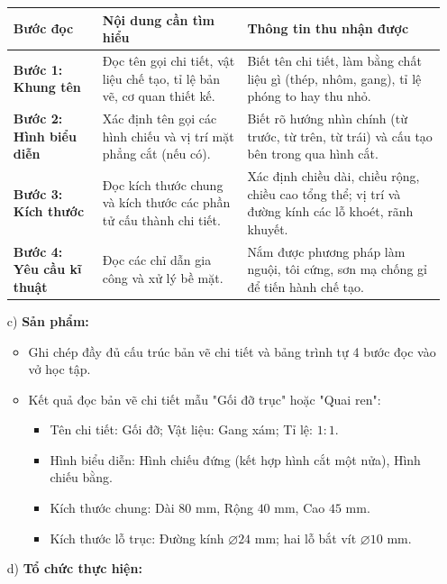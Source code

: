 \documentclass[12pt, a4paper]{article}
\begin{document}
\begin{itemize}[leftmargin=1.2cm]
    \begin{center}
    \begin{tabularx}{\textwidth}{|>{\bfseries}p{3.2cm}|X|X|}
    \hline
    \textbf{Bước đọc} & \textbf{Nội dung cần tìm hiểu} & \textbf{Thông tin thu nhận được} \\ \hline
    Bước 1: Khung tên & Đọc tên gọi chi tiết, vật liệu chế tạo, tỉ lệ bản vẽ, cơ quan thiết kế. & Biết tên chi tiết, làm bằng chất liệu gì (thép, nhôm, gang), tỉ lệ phóng to hay thu nhỏ. \\ \hline
    Bước 2: Hình biểu diễn & Xác định tên gọi các hình chiếu và vị trí mặt phẳng cắt (nếu có). & Biết rõ hướng nhìn chính (từ trước, từ trên, từ trái) và cấu tạo bên trong qua hình cắt. \\ \hline
    Bước 3: Kích thước & Đọc kích thước chung và kích thước các phần tử cấu thành chi tiết. & Xác định chiều dài, chiều rộng, chiều cao tổng thể; vị trí và đường kính các lỗ khoét, rãnh khuyết. \\ \hline
    Bước 4: Yêu cầu kĩ thuật & Đọc các chỉ dẫn gia công và xử lý bề mặt. & Nắm được phương pháp làm nguội, tôi cứng, sơn mạ chống gỉ để tiến hành chế tạo. \\ \hline
    \end{tabularx}
    \end{center}

    \item[c)] \textbf{Sản phẩm:}
    \begin{itemize}[leftmargin=0.6cm]
        \item Ghi chép đầy đủ cấu trúc bản vẽ chi tiết và bảng trình tự 4 bước đọc vào vở học tập.
        \item Kết quả đọc bản vẽ chi tiết mẫu "Gối đỡ trục" hoặc "Quai ren":
        \begin{itemize}
            \item Tên chi tiết: Gối đỡ; Vật liệu: Gang xám; Tỉ lệ: $1:1$.
            \item Hình biểu diễn: Hình chiếu đứng (kết hợp hình cắt một nửa), Hình chiếu bằng.
            \item Kích thước chung: Dài $80\text{ mm}$, Rộng $40\text{ mm}$, Cao $45\text{ mm}$.
            \item Kích thước lỗ trục: Đường kính $\varnothing 24\text{ mm}$; hai lỗ bắt vít $\varnothing 10\text{ mm}$.
        \end{itemize}
    \end{itemize}

    \item[d)] \textbf{Tổ chức thực hiện:}
\end{itemize}
\end{document}
